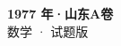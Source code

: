 \documentclass[zihao=-4, a4paper]{ctexart}
\begin{document}
\begin{center}
  {\Large\bfseries 1977 年·山东A卷}\\[4pt]
  {\large 数学 · 试题版}
\end{center}
\medskip
{}

\end{document}
